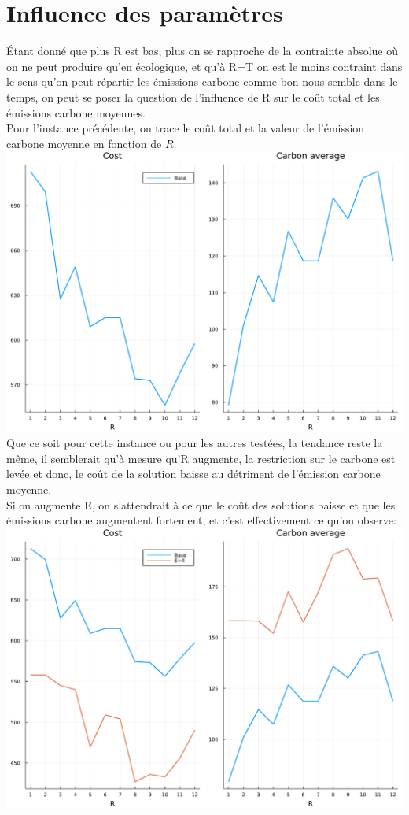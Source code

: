 \documentclass{article}
\begin{document}
	\section{Influence des paramètres}
	Étant donné que plus R est bas, plus on se rapproche de la contrainte absolue où on ne peut produire qu'en écologique, et qu'à R=T on est le moins contraint dans le sens qu'on peut répartir les émissions carbone comme bon nous semble dans le temps, on peut se poser la question de l'influence de R sur le coût total et les émissions carbone moyennes.\\
	Pour l'instance précédente, on trace le coût total et la valeur de l'émission carbone moyenne en fonction de $R$.\\
	\includegraphics[width=\textwidth]{graph1.pdf}\\
	Que ce soit pour cette instance ou pour les autres testées, la tendance reste la même, il semblerait qu'à mesure qu'R augmente, la restriction sur le carbone est levée et donc, le coût de la solution baisse au détriment de l'émission carbone moyenne.\\
	\newpage
	Si on augmente E, on s'attendrait à ce que le coût des solutions baisse et que les émissions carbone augmentent fortement, et c'est effectivement ce qu'on observe:\\
	\includegraphics[width=\textwidth]{graph2.pdf}\\
\end{document}
